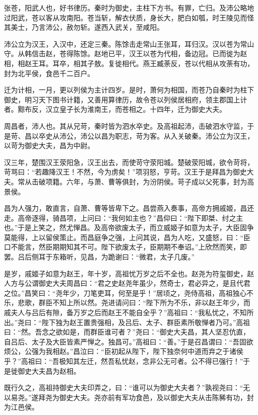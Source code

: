 \documentclass[]{article}
\begin{document}
张苍，阳武人也，好书律历。秦时为御史，主柱下方书。有罪，亡归。及沛公略地过阳武，苍以客从攻南阳。苍当斩，解衣伏质，身长大，肥白如瓠，时王陵见而怪其美士，乃言沛公，赦勿斩。遂西入武关，至咸阳。

沛公立为汉王，入汉中，还定三秦。陈馀击走常山王张耳，耳归汉。汉以苍为常山守。从韩信击赵，苍得陈馀。赵地已平，汉王以苍为代相，备边冠。已而徙为赵相，相赵王耳。耳卒，相其子敖。复徙相代。燕王臧荼反，苍以代相从攻荼有功，封为北平侯，食邑千二百户。

迁为计相，一月，更以列侯为主计四岁。是时，萧何为相国，而苍乃自秦时为柱下御史，明习天下图书计籍，又善用算律历，故令苍以列侯居相府，领主郡国上计者。黥布反，汉立皇子长为淮南王，而苍相之。十四年，迁为御史大夫。

周昌者，沛人也。其从兄苛，秦时皆为泗水卒史。及高祖起沛，击破泗水守监，于是苛、昌以卒史从沛公，沛公以昌为职志，苛为客。从入关破秦。沛公立为汉王，以苛为御史大夫，昌为中尉。

汉三年，楚围汉王荥阳急，汉王出去，而使苛守荥阳城。楚破荥阳城，欲令苛将，苛骂曰：``若趣降汉王！不然，今为虏矣！''项羽怒，亨苛。汉王于是拜昌为御史大夫。常从击破项籍。六年，与萧、曹等俱封，为汾阴侯。苛子成以父死事，封为高景侯。

昌为人强力，敢直言，自萧、曹等皆卑下之。昌尝燕入奏事，高帝方拥戚姬，昌还走。高帝逐得，骑昌项，上问曰：``我何如主也？''昌仰曰：``陛下即桀、纣之主也。''于是上笑之，然尤惮昌。及高帝欲废太子，而立威姬子如意为太子，大臣固争莫能得，上以留侯策止。而昌庭争之强，上问其说，昌为人吃，又盛怒，曰：``臣口不能言，然臣期期知其不可。陛下欲废太子，臣期期不奉诏。''上欣然而笑，即罢。吕后侧耳于东箱听，见昌，为跪谢曰：``微君，太子几废。''

是岁，戚姬子如意为赵王，年十岁，高祖忧万岁之后不全也。赵尧为符玺御史，赵人方与公谓御史大夫周昌曰：``君之史赵尧年虽少，然奇士，君必异之，是且代君之位。''昌笑曰：``尧年少，刀笔吏耳，何至是乎！''居顷之，尧侍高祖，高祖独心不乐，悲歌，群臣不知上所以然。尧进请问曰：``陛下所为不乐，非以赵王年少，而戚夫人与吕后有隙，备万岁之后而赵王不能自全乎？''高祖曰：``我私忧之，不知所出。''尧曰：``陛下独为赵王置贵强相，及吕后、太子、群臣素所敬惮者乃可。''高祖曰：``然。吾念之欲如是，而群臣谁可者？''尧曰：``御史大夫昌，其人坚忍伉直，自吕后、太子及大臣皆素严惮之。独昌可。''高祖曰：``善。''于是召昌谓曰：``吾固欲烦公，公强为我相赵。''昌泣曰：``臣初起从陛下，陛下独奈何中道而弃之于诸侯乎？''高祖曰：``吾极知其左迁，然吾私忧赵，念非公无可者。公不得已强行！''于是徙御史大夫昌为赵相。

既行久之，高祖持御史大夫印弄之，曰：``谁可以为御史大夫者？''孰视尧曰：``无以易尧。''遂拜尧为御史大夫。尧亦前有军功食邑，及以御史大夫从击陈豨有功，封为江邑侯。
\end{document}
